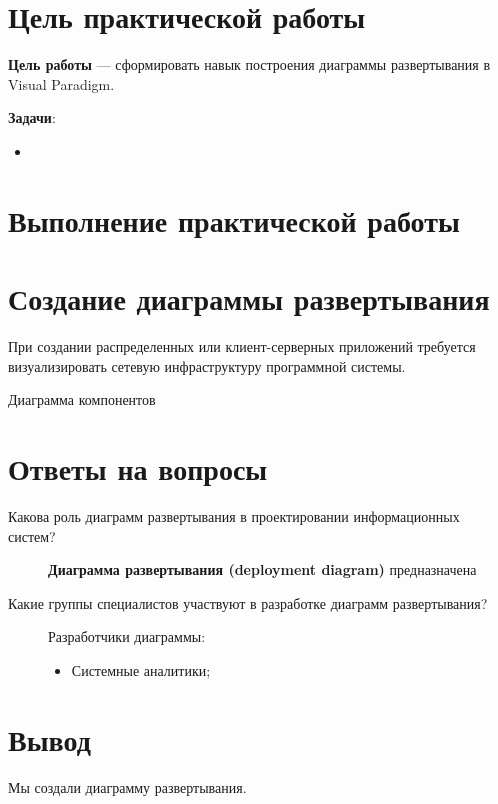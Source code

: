 \graphicspath{{./pattern/img/}} %

\section*{\LARGE Цель практической работы}

\textbf{Цель работы} --- сформировать навык построения диаграммы
развертывания в Visual Paradigm.

\textbf{Задачи}:
\begin{itemize}
	\item 
\end{itemize}

\clearpage

\section*{\LARGE Выполнение практической работы}
\section{Создание диаграммы развертывания}
При создании распределенных или клиент-серверных приложений
требуется визуализировать сетевую инфраструктуру программной системы.\par

\begin{image}
	\caption{Диаграмма компонентов}
	\label{fig:deployments}
\end{image}

\clearpage

\section*{Ответы на вопросы}

\begin{description}
	\item [Какова роль диаграмм развертывания в проектировании
		информационных систем?]
		\textbf{Диаграмма развертывания (deployment diagram)} предназначена
	\item [Какие группы специалистов участвуют в разработке диаграмм
		развертывания?]
		Разработчики диаграммы:
		\begin{itemize}
			\item Системные аналитики;
		\end{itemize}
\end{description}

\clearpage

\section*{\LARGE Вывод}
Мы создали диаграмму развертывания.\par

